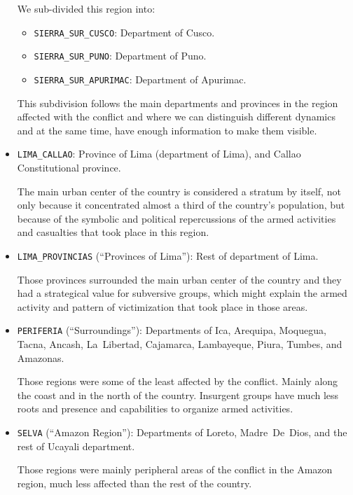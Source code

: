 \documentclass{article}
\begin{document}
\begin{itemize}
    We sub-divided this region into:
    \begin{itemize}
      \item \texttt{SIERRA\_SUR\_CUSCO}: Department of Cusco.
      \item \texttt{SIERRA\_SUR\_PUNO}: Department of Puno.
      \item \texttt{SIERRA\_SUR\_APURIMAC}: Department of Apurimac.
    \end{itemize}

This subdivision follows the main departments and provinces in the region affected with the conflict and where we can distinguish different dynamics and at the same time, have enough information to make them visible.

  \item \texttt{LIMA\_CALLAO}: Province of Lima (department of Lima), and Callao Constitutional province.

The main urban center of the country is considered a stratum by itself, not only because it concentrated almost a third of the country's population, but because of the symbolic and political repercussions of the armed activities and casualties that took place in this region.

  \item \texttt{LIMA\_PROVINCIAS} (``Provinces of Lima''): Rest of department of Lima.

    Those provinces surrounded the main urban center of the country and they had a strategical value for subversive groups, which might explain the armed activity and pattern of victimization that took place in those areas. 

 \item \texttt{PERIFERIA} (``Surroundings''): Departments of Ica, Arequipa, Moquegua, Tacna, Ancash, La~Libertad, Cajamarca, Lambayeque, Piura, Tumbes, and Amazonas.

Those regions were some of the least affected by the conflict. Mainly along the coast and in the north of the country. Insurgent groups have much less roots and presence and capabilities to organize armed activities. 

  \item \texttt{SELVA} (``Amazon Region''): Departments of Loreto, Madre~De~Dios, and the rest of Ucayali department.

    Those regions were mainly peripheral areas of the conflict in the Amazon region, much less affected than the rest of the country.


\end{itemize}
\end{document}
